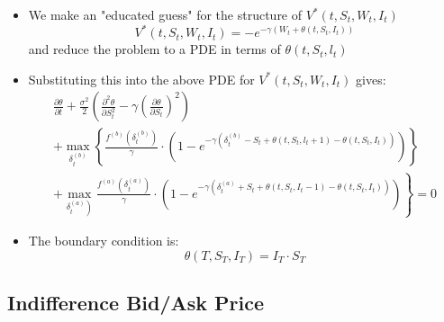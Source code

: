 \documentclass[10pt]{article}
\begin{document}
\begin{itemize} 
    \item We make an "educated guess" for the structure of $V^{*}\left(t, S_{t}, W_{t}, I_{t}\right)$
    \[
    V^{*}\left(t, S_{t}, W_{t}, I_{t}\right)=-e^{-\gamma\left(W_{t}+\theta\left(t, S_{t}, I_{t}\right)\right)} \tag{1}
    \]
    and reduce the problem to a PDE in terms of $\theta\left(t, S_{t}, l_{t}\right)$
    \item Substituting this into the above PDE for $V^{*}\left(t, S_{t}, W_{t}, I_{t}\right)$ gives:
    $$
    \begin{array}{l}
    \frac{\partial \theta}{\partial t}+\frac{\sigma^{2}}{2}\left(\frac{\partial^{2} \theta}{\partial S_{t}^{2}}-\gamma\left(\frac{\partial \theta}{\partial S_{t}}\right)^{2}\right) \\
    +\underset{\delta_{t}^{(b)}}{\max }\left\{\frac{f^{(b)}\left(\delta_{t}^{(b)}\right)}{\gamma} \cdot\left(1-e^{-\gamma\left(\delta_{t}^{(b)}-S_{t}+\theta\left(t, S_{t}, l_{t}+1\right)-\theta\left(t, S_{t}, I_{t}\right)\right)}\right)\right\} \\
    \left.+\max _{\left.\delta_{t}^{(a)}\right)} \frac{f^{(a)}\left(\delta_{t}^{(a)}\right)}{\gamma} \cdot\left(1-e^{-\gamma\left(\delta_{t}^{(a)}+S_{t}+\theta\left(t, S_{t}, I_{t}-1\right)-\theta\left(t, S_{t}, I_{t}\right)\right)}\right)\right\}=0
    \end{array}
    $$
    \item The boundary condition is:
    $$
    \theta\left(T, S_{T}, I_{T}\right)=I_{T} \cdot S_{T}
    $$
\end{itemize}

\subsection{Indifference Bid/Ask Price}
\end{document}
